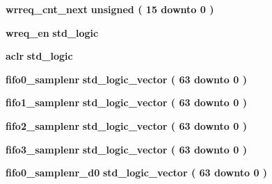 \begin{DoxyCompactItemize}
\item 
{\bf wrreq\+\_\+cnt\+\_\+next} {\bfseries \textcolor{comment}{unsigned}\textcolor{vhdlchar}{ }\textcolor{vhdlchar}{(}\textcolor{vhdlchar}{ }\textcolor{vhdlchar}{ } \textcolor{vhdldigit}{15} \textcolor{vhdlchar}{ }\textcolor{keywordflow}{downto}\textcolor{vhdlchar}{ }\textcolor{vhdlchar}{ } \textcolor{vhdldigit}{0} \textcolor{vhdlchar}{ }\textcolor{vhdlchar}{)}\textcolor{vhdlchar}{ }} 
\item 
{\bf wreq\+\_\+en} {\bfseries \textcolor{comment}{std\+\_\+logic}\textcolor{vhdlchar}{ }} 
\item 
{\bf aclr} {\bfseries \textcolor{comment}{std\+\_\+logic}\textcolor{vhdlchar}{ }} 
\item 
{\bf fifo0\+\_\+samplenr} {\bfseries \textcolor{comment}{std\+\_\+logic\+\_\+vector}\textcolor{vhdlchar}{ }\textcolor{vhdlchar}{(}\textcolor{vhdlchar}{ }\textcolor{vhdlchar}{ } \textcolor{vhdldigit}{63} \textcolor{vhdlchar}{ }\textcolor{keywordflow}{downto}\textcolor{vhdlchar}{ }\textcolor{vhdlchar}{ } \textcolor{vhdldigit}{0} \textcolor{vhdlchar}{ }\textcolor{vhdlchar}{)}\textcolor{vhdlchar}{ }} 
\item 
{\bf fifo1\+\_\+samplenr} {\bfseries \textcolor{comment}{std\+\_\+logic\+\_\+vector}\textcolor{vhdlchar}{ }\textcolor{vhdlchar}{(}\textcolor{vhdlchar}{ }\textcolor{vhdlchar}{ } \textcolor{vhdldigit}{63} \textcolor{vhdlchar}{ }\textcolor{keywordflow}{downto}\textcolor{vhdlchar}{ }\textcolor{vhdlchar}{ } \textcolor{vhdldigit}{0} \textcolor{vhdlchar}{ }\textcolor{vhdlchar}{)}\textcolor{vhdlchar}{ }} 
\item 
{\bf fifo2\+\_\+samplenr} {\bfseries \textcolor{comment}{std\+\_\+logic\+\_\+vector}\textcolor{vhdlchar}{ }\textcolor{vhdlchar}{(}\textcolor{vhdlchar}{ }\textcolor{vhdlchar}{ } \textcolor{vhdldigit}{63} \textcolor{vhdlchar}{ }\textcolor{keywordflow}{downto}\textcolor{vhdlchar}{ }\textcolor{vhdlchar}{ } \textcolor{vhdldigit}{0} \textcolor{vhdlchar}{ }\textcolor{vhdlchar}{)}\textcolor{vhdlchar}{ }} 
\item 
{\bf fifo3\+\_\+samplenr} {\bfseries \textcolor{comment}{std\+\_\+logic\+\_\+vector}\textcolor{vhdlchar}{ }\textcolor{vhdlchar}{(}\textcolor{vhdlchar}{ }\textcolor{vhdlchar}{ } \textcolor{vhdldigit}{63} \textcolor{vhdlchar}{ }\textcolor{keywordflow}{downto}\textcolor{vhdlchar}{ }\textcolor{vhdlchar}{ } \textcolor{vhdldigit}{0} \textcolor{vhdlchar}{ }\textcolor{vhdlchar}{)}\textcolor{vhdlchar}{ }} 
\item 
{\bf fifo0\+\_\+samplenr\+\_\+d0} {\bfseries \textcolor{comment}{std\+\_\+logic\+\_\+vector}\textcolor{vhdlchar}{ }\textcolor{vhdlchar}{(}\textcolor{vhdlchar}{ }\textcolor{vhdlchar}{ } \textcolor{vhdldigit}{63} \textcolor{vhdlchar}{ }\textcolor{keywordflow}{downto}\textcolor{vhdlchar}{ }\textcolor{vhdlchar}{ } \textcolor{vhdldigit}{0} \textcolor{vhdlchar}{ }\textcolor{vhdlchar}{)}\textcolor{vhdlchar}{ }} 

\end{DoxyCompactItemize}
